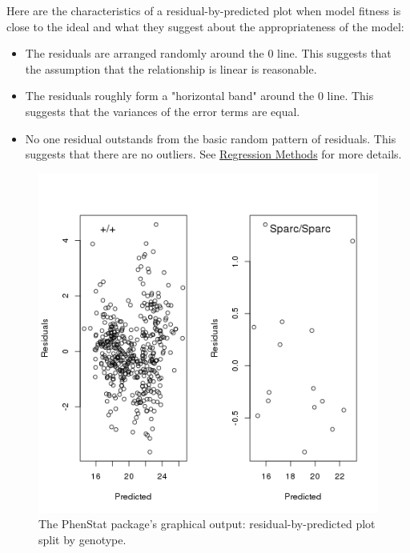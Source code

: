 \documentclass[12pt,a4paper]{article}
\begin{document}
Here are the characteristics of a residual-by-predicted plot when model fitness is close to the ideal and what they suggest about the appropriateness of the model:
\begin{itemize}
\item The residuals are arranged randomly around the 0 line. This suggests that the assumption that the relationship is linear is reasonable.
\item The residuals roughly form a "horizontal band" around the 0 line. This suggests that the variances of the error terms are equal.
\item No one residual outstands from the basic random pattern of residuals. This suggests that there are no outliers. See \href{https://onlinecourses.science.psu.edu/stat501/node/36}{Regression Methods} for more details.
\end{itemize}
\begin{figure}[!htpb]%
\centerline{\includegraphics[scale=0.5]{plotResidualPredicted.png}}
\caption{The PhenStat package's graphical output: residual-by-predicted plot split by genotype.}\label{fig:12}
\end{figure}
\end{document}
